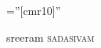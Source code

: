 

\pagestyle{empty}
\font \fb=''[cmr10]''
\par{	\centering
	{
		 \Huge sreeram \textsc{sadasivam}
	}\bigskip
\par}

